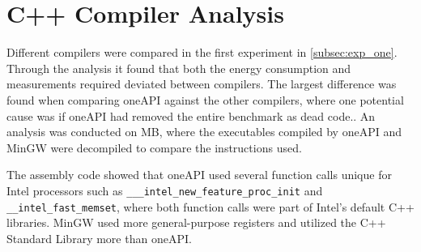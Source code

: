 \section{C++ Compiler Analysis}\label{app:compiler-analysis}

Different compilers were compared in the first experiment in \cref{subsec:exp_one}. Through the analysis it found that both the energy consumption and measurements required deviated between compilers. The largest difference was found when comparing oneAPI against the other compilers, where one potential cause was if oneAPI had removed the entire benchmark as dead code.\cite{sestoft2013microbenchmarks}. An analysis was conducted on MB, where the executables compiled by oneAPI and MinGW were decompiled to compare the instructions used.


The assembly code showed that oneAPI used several function calls unique for Intel processors such as \texttt{\_\_\_intel\_new\_feature\_proc\_init} and \texttt{\_\_intel\_fast\_memset}, where both function calls were part of Intel's default C++ libraries.\cite{Intelassembly} MinGW used more general-purpose registers and utilized the C++ Standard Library more than oneAPI.






